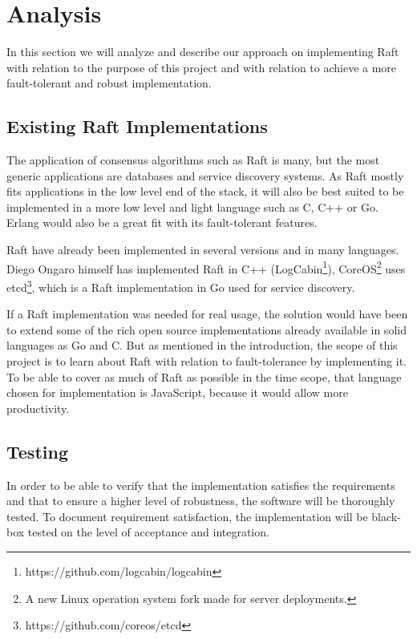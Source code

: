 \section{Analysis} %
\label{sec:analysis}

In this section we will analyze and describe our approach on implementing Raft with relation to the purpose of this project and with relation to achieve a more fault-tolerant and robust implementation.

\subsection{Existing Raft Implementations} %
\label{sub:existing_raft_implementations}

The application of consensus algorithms such as Raft is many, but the most generic applications are databases and service discovery systems. As Raft mostly fits applications in the low level end of the stack, it will also be best suited to be implemented in a more low level and light language such as C, C++ or Go. Erlang would also be a great fit with its fault-tolerant features.

Raft have already been implemented in several versions and in many languages. Diego Ongaro himself has implemented Raft in C++ (LogCabin\footnote{https://github.com/logcabin/logcabin}), CoreOS\footnote{A new Linux operation system fork made for server deployments.} uses etcd\footnote{https://github.com/coreos/etcd}, which is a Raft implementation in Go used for service discovery.

If a Raft implementation was needed for real usage, the solution would have been to extend some of the rich open source implementations already available in solid languages as Go and C. But as mentioned in the introduction, the scope of this project is to learn about Raft with relation to fault-tolerance by implementing it. To be able to cover as much of Raft as possible in the time scope, that language chosen for implementation is JavaScript, because it would allow more productivity.


\subsection{Testing} %
\label{sub:testing}

In order to be able to verify that the implementation satisfies the requirements and that to ensure a higher level of robustness, the software will be thoroughly tested. To document requirement satisfaction, the implementation will be black-box tested on the level of acceptance and integration.

